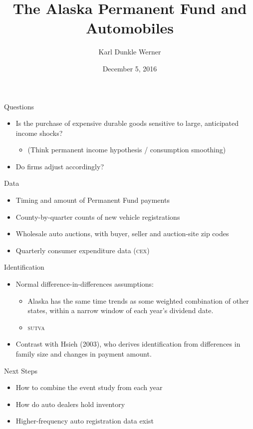 \documentclass[aspectratio=169]{beamer}
\title[Alaska]{The Alaska Permanent Fund and Automobiles}
\author{Karl Dunkle Werner}
\institute{}
\date{December 5, 2016}
\begin{document}
\begin{frame}[plain]
	\maketitle
\end{frame}

{
\begin{frame}[plain]
\end{frame}
}

\begin{frame}{Questions}
	\begin{itemize}
		\item Is the purchase of expensive durable goods sensitive to large, anticipated income shocks?
			\begin{itemize}
				\item (Think permanent income hypothesis / consumption smoothing)
			\end{itemize}
		\item Do firms adjust accordingly?
	\end{itemize}
\end{frame}

\begin{frame}{Data}
	\begin{itemize}
		\item Timing and amount of Permanent Fund payments
		\item County-by-quarter counts of new vehicle registrations
		\item Wholesale auto auctions, with buyer, seller and auction-site zip codes
		\item Quarterly consumer expenditure data (\textsc{cex})
	\end{itemize}
	
\end{frame}

\begin{frame}{Identification}
	\begin{itemize}
		\item Normal difference-in-differences assumptions:
			\begin{itemize}
				\item Alaska has the same time trends as some weighted combination of other states, within a narrow window of each year's dividend date.
				\item \textsc{sutva}
			\end{itemize}
		\item Contrast with Hsieh (2003), who derives identification from differences in family size and changes in payment amount.
	\end{itemize}
\end{frame}

\begin{frame}{Next Steps}
	\begin{itemize}
		\item How to combine the event study from each year
		\item How do auto dealers hold inventory
		\item Higher-frequency auto registration data exist
	\end{itemize}
\end{frame}
\end{document}
